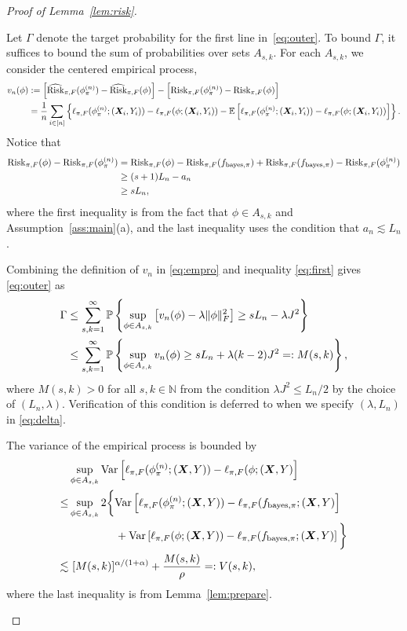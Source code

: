 \documentclass[11pt]{article}
\theoremstyle{plain}
\theoremstyle{definition}
\def\bayespif{f_{\textup{bayes},\pi}}
\def\riskF{\textup{Risk}_{\pi,F}}
\def\eriskF{\widehat{\textup{Risk}}_{\pi,F}}
\begin{document}
\begin{proof}[Proof of Lemma~\ref{lem:risk}]
\begin{enumerate}[label={2.\arabic*},wide, labelwidth=!, labelindent=0pt]
Let $\Gamma$ denote the target probability for the first line in~\eqref{eq:outer}. To bound $\Gamma$, it suffices to bound the sum of probabilities over sets $A_{s,k}$.  For  each $ A_{s,k}$, we consider the centered empirical process,
\begin{align}\label{eq:empro}
v_n(\phi)&:=\left[\eriskF(\phi_\pi^{(n)})-\eriskF(\phi)\right]-\left[\riskF(\phi_\pi^{(n)})-\riskF(\phi)\right]\notag \\
&=\frac{1}{n}\sum_{i\in[n]}\left\{\ell_{\pi,F}(\phi_\pi^{(n)};(\mX_i,Y_i))-\ell_{\pi,F}(\phi;(\mX_i,Y_i))-\mathbb{E}\left[\ell_{\pi,F}(\phi_\pi^{(n)};(\mX_i,Y_i))-\ell_{\pi,F}(\phi;(\mX_i,Y_i))\right]\right\}.
\end{align}
Notice that 
\begin{align}\label{eq:first}
\riskF(\phi)-\riskF(\phi_\pi^{(n)}) &= \riskF(\phi)-\riskF(\bayespif)+\riskF(\bayespif)-\riskF(\phi_\pi^{(n)})\nonumber\\&\geq (s+1)L_n -a_n\nonumber
\\&\geq  sL_n,
\end{align}
where the first inequality is from the fact that $\phi\in A_{s,k}$ and Assumption~\ref{ass:main}(a), and the last inequality uses the condition that $a_n\lesssim L_n$.

Combining the definition of $v_n$ in \eqref{eq:empro} and inequality \eqref{eq:first} gives \eqref{eq:outer} as
\begin{align}\label{eq:union}
\Gamma&\leq \sum_{s,k=1}^\infty\mathbb{P}\left\{\sup_{\phi\in A_{s,k}}  \left[v_n(\phi) -\lambda \lVert\phi\rVert_F^2 \right]\geq sL_n -\lambda J^2\right\}\nonumber\\&\leq \sum_{s,k=1}^\infty\mathbb{P}\left\{\sup_{\phi\in A_{s,k}}  v_n(\phi)\geq sL_n + \lambda(k-2) J^2=: M(s,k)\right\},
\end{align}
where  $M(s,k)>0$ for all $s,k\in\mathbb{N}$ from the condition $\lambda J^2\leq L_n/2$ by the choice of $(L_n,\lambda)$. Verification of this condition is deferred to when we specify $(\lambda,L_n)$ in \eqref{eq:delta}. 

The variance of the empirical process is bounded by
\begin{align}\label{eq:second}
&\sup_{\phi\in A_{s,k}}\textup{Var}\left[\ell_{\pi,F}(\phi_\pi^{(n)};(\mX,Y))-\ell_{\pi,F}(\phi;(\mX,Y)\right]\notag \\
\leq&\sup_{\phi\in A_{s,k}}2\bigg\{ \textup{Var}\left[\ell_{\pi,F}(\phi_\pi^{(n)};(\mX,Y))-\ell_{\pi,F}(\bayespif;(\mX,Y)\right]\notag \\
& \hspace{1.5cm}+\textup{Var}\left[\ell_{\pi,F}(\phi;(\mX,Y))-\ell_{\pi,F}(\bayespif;(\mX,Y)\right]\bigg\}\notag \\
\lesssim &\ [M(s,k)]^{\alpha/(1+\alpha)}+{M(s,k)\over \rho}=:V(s,k),
\end{align}
where the last inequality is from Lemma~\ref{lem:prepare}.



\end{enumerate}
\end{proof}
\end{document}
